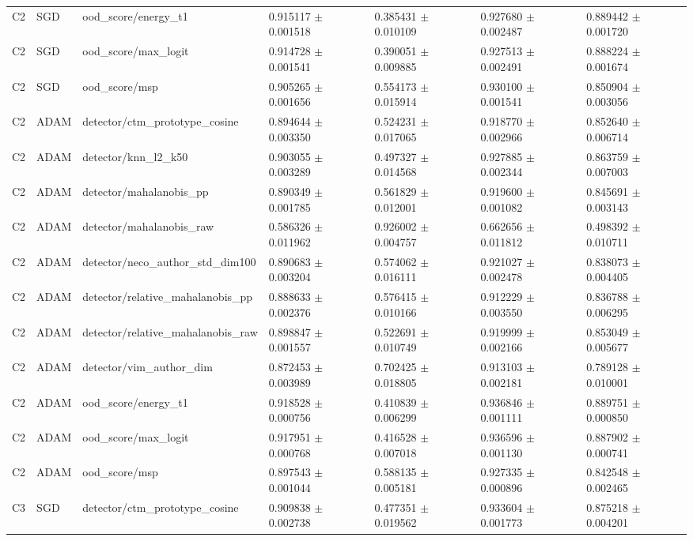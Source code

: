 \begin{longtable}{lllllll}
C2 & SGD & ood\_score/energy\_t1 & 0.915117 $\pm$ 0.001518 & 0.385431 $\pm$ 0.010109 & 0.927680 $\pm$ 0.002487 & 0.889442 $\pm$ 0.001720 \\
C2 & SGD & ood\_score/max\_logit & 0.914728 $\pm$ 0.001541 & 0.390051 $\pm$ 0.009885 & 0.927513 $\pm$ 0.002491 & 0.888224 $\pm$ 0.001674 \\
C2 & SGD & ood\_score/msp & 0.905265 $\pm$ 0.001656 & 0.554173 $\pm$ 0.015914 & 0.930100 $\pm$ 0.001541 & 0.850904 $\pm$ 0.003056 \\
C2 & ADAM & detector/ctm\_prototype\_cosine & 0.894644 $\pm$ 0.003350 & 0.524231 $\pm$ 0.017065 & 0.918770 $\pm$ 0.002966 & 0.852640 $\pm$ 0.006714 \\
C2 & ADAM & detector/knn\_l2\_k50 & 0.903055 $\pm$ 0.003289 & 0.497327 $\pm$ 0.014568 & 0.927885 $\pm$ 0.002344 & 0.863759 $\pm$ 0.007003 \\
C2 & ADAM & detector/mahalanobis\_pp & 0.890349 $\pm$ 0.001785 & 0.561829 $\pm$ 0.012001 & 0.919600 $\pm$ 0.001082 & 0.845691 $\pm$ 0.003143 \\
C2 & ADAM & detector/mahalanobis\_raw & 0.586326 $\pm$ 0.011962 & 0.926002 $\pm$ 0.004757 & 0.662656 $\pm$ 0.011812 & 0.498392 $\pm$ 0.010711 \\
C2 & ADAM & detector/neco\_author\_std\_dim100 & 0.890683 $\pm$ 0.003204 & 0.574062 $\pm$ 0.016111 & 0.921027 $\pm$ 0.002478 & 0.838073 $\pm$ 0.004405 \\
C2 & ADAM & detector/relative\_mahalanobis\_pp & 0.888633 $\pm$ 0.002376 & 0.576415 $\pm$ 0.010166 & 0.912229 $\pm$ 0.003550 & 0.836788 $\pm$ 0.006295 \\
C2 & ADAM & detector/relative\_mahalanobis\_raw & 0.898847 $\pm$ 0.001557 & 0.522691 $\pm$ 0.010749 & 0.919999 $\pm$ 0.002166 & 0.853049 $\pm$ 0.005677 \\
C2 & ADAM & detector/vim\_author\_dim & 0.872453 $\pm$ 0.003989 & 0.702425 $\pm$ 0.018805 & 0.913103 $\pm$ 0.002181 & 0.789128 $\pm$ 0.010001 \\
C2 & ADAM & ood\_score/energy\_t1 & 0.918528 $\pm$ 0.000756 & 0.410839 $\pm$ 0.006299 & 0.936846 $\pm$ 0.001111 & 0.889751 $\pm$ 0.000850 \\
C2 & ADAM & ood\_score/max\_logit & 0.917951 $\pm$ 0.000768 & 0.416528 $\pm$ 0.007018 & 0.936596 $\pm$ 0.001130 & 0.887902 $\pm$ 0.000741 \\
C2 & ADAM & ood\_score/msp & 0.897543 $\pm$ 0.001044 & 0.588135 $\pm$ 0.005181 & 0.927335 $\pm$ 0.000896 & 0.842548 $\pm$ 0.002465 \\
C3 & SGD & detector/ctm\_prototype\_cosine & 0.909838 $\pm$ 0.002738 & 0.477351 $\pm$ 0.019562 & 0.933604 $\pm$ 0.001773 & 0.875218 $\pm$ 0.004201 \\

\end{longtable}
